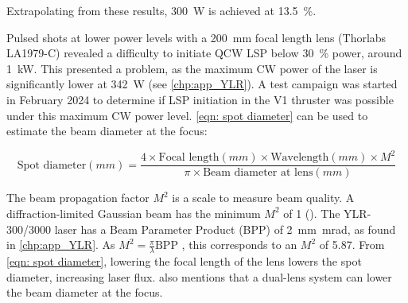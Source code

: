             Extrapolating from these results, \qty{300}{W} is achieved at \qty{13.5}{\%}.

            Pulsed shots at lower power levels with a \qty{200}{mm} focal length lens (Thorlabs LA1979-C) revealed a difficulty to initiate QCW LSP below \qty{30}{\%} power, around \qty{1}{kW}. This presented a problem, as the maximum CW power of the laser is significantly lower at \qty{342}{W} (see \autoref{chp:app_YLR}). A test campaign was started in February 2024 to determine if LSP initiation in the V1 thruster was possible under this maximum CW power level. \autoref{eqn: spot diameter} \cite{LaserSpotSize} can be used to estimate the beam diameter at the focus:
            
            \begin{equation}\label{eqn: spot diameter}
                \text{Spot diameter}(mm) = \frac{4 \times \text{Focal length}(mm) \times \text{Wavelength}(mm) \times M^2}{\pi \times \text{Beam diameter at lens}(mm)}
            \end{equation}

            The beam propagation factor $M^2$ is a scale to measure beam quality. A diffraction-limited Gaussian beam has the minimum $M^2$ of 1 (\textcite{hechtUnderstandingLasersEntry2019}). The YLR-300/3000 laser has a Beam Parameter Product (BPP) of \qty{2}{mm.mrad}, as found in \autoref{chp:app_YLR}. As $M^2 = \frac{\pi}{\lambda} \text{BPP}$ \cite{paschottaBeamParameterProduct}, this corresponds to an $M^2$ of 5.87. From \autoref{eqn: spot diameter}, lowering the focal length of the lens lowers the spot diameter, increasing laser flux. \textcite{LensTutorial} also mentions that a dual-lens system can lower the beam diameter at the focus.

